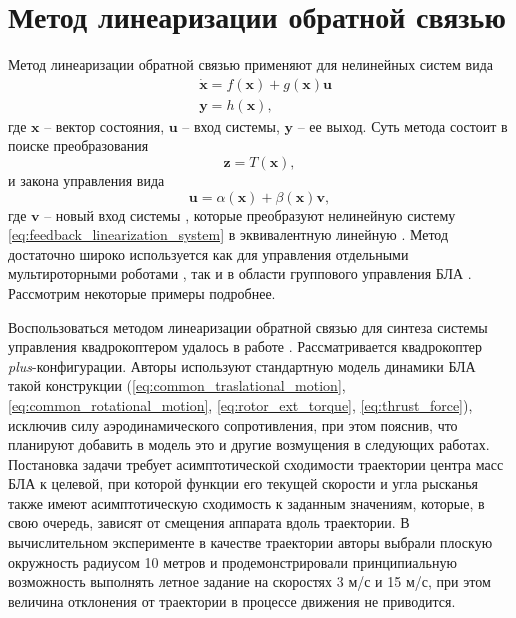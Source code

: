 \section{Метод линеаризации обратной связью}

Метод линеаризации обратной связью применяют для нелинейных систем вида
\begin{equation} \label{eq:feedback_linearization_system}
\begin{aligned}
&\dot{\bm x} = f(\bm x) + g(\bm x) \bm u\\
&\bm y = h(\bm x),
\end{aligned}
\end{equation}
где $\bm x$ -- вектор состояния, $\bm u$ -- вход системы, $\bm y$ -- ее выход.
Суть метода состоит в поиске преобразования 
\begin{equation} \label{eq:feedback_linearization_transform}
\bm z = T(\bm x),
\end{equation}
и закона управления вида
\begin{equation} \label{eq:feedback_linearization_control}
\bm u = \alpha(\bm x) + \beta(\bm x) \bm v,
\end{equation}
где $\bm v$ -- новый вход системы , которые преобразуют нелинейную систему \eqref{eq:feedback_linearization_system} в эквивалентную линейную \cite{Slotine01}. Метод достаточно широко используется как для управления отдельными мультироторными роботами \cite{Chang01, Freddi01}, так и в области группового управления БЛА \cite{Mahmood01}. Рассмотрим некоторые примеры подробнее.

Воспользоваться методом линеаризации обратной связью для синтеза системы управления квадрокоптером удалось в работе \cite{Roza01}. Рассматривается квадрокоптер \textit{plus}-конфигурации. Авторы используют стандартную модель динамики БЛА такой конструкции (\ref{eq:common_traslational_motion}, \ref{eq:common_rotational_motion}, \ref{eq:rotor_ext_torque}, \ref{eq:thrust_force}), исключив силу аэродинамического сопротивления, при этом пояснив, что планируют добавить в модель это и другие возмущения в следующих работах. Постановка задачи требует асимптотической сходимости траектории центра масс БЛА к целевой, при которой функции его текущей скорости и угла рысканья также имеют асимптотическую сходимость к заданным значениям, которые, в свою очередь, зависят от смещения аппарата вдоль траектории. В вычислительном эксперименте в качестве траектории авторы выбрали плоскую окружность радиусом 10 метров и продемонстрировали принципиальную возможность выполнять летное задание на скоростях 3 м/с и 15 м/с, при этом величина отклонения от траектории в процессе движения не приводится.

